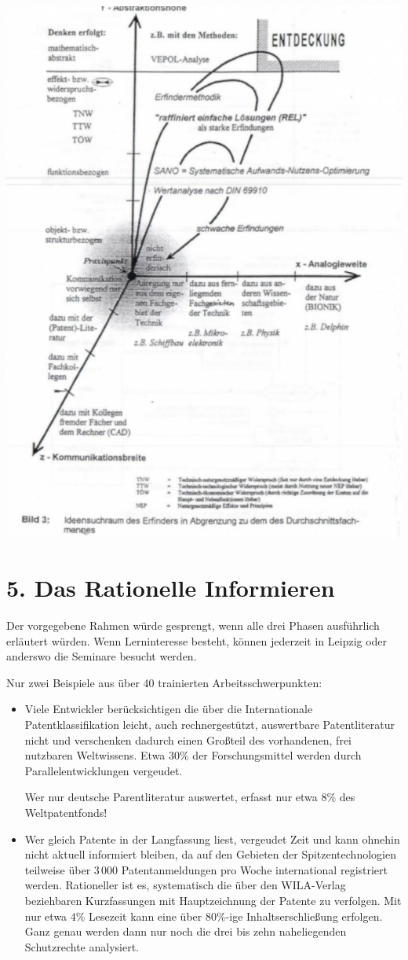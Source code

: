 \documentclass[11pt,a4paper]{article}
\begin{document}
\begin{center}
  \includegraphics[width=.9\textwidth]{HF-A.pdf}
\end{center}
\newpage

\section*{5. Das Rationelle Informieren}

Der vorgegebene Rahmen würde gesprengt, wenn alle drei Phasen ausführlich
erläutert wür\-den.  Wenn Lerninteresse besteht, können jederzeit in Leipzig
oder anderswo die Seminare besucht werden.

Nur zwei Beispiele aus über 40 trainierten Arbeitsschwerpunkten:
\begin{itemize}
\item Viele Entwickler berücksichtigen die über die Internationale
  Patentklassifikation leicht, auch rechnergestützt, auswertbare
  Patentliteratur nicht und verschenken dadurch einen Großteil des
  vorhandenen, frei nutzbaren Weltwissens. Etwa 30\% der Forschungsmittel
  werden durch Parallelentwicklungen vergeudet.

  Wer nur deutsche Parentliteratur auswertet, erfasst nur etwa 8\% des
  Weltpatentfonds!
\item Wer gleich Patente in der Langfassung liest, vergeudet Zeit und kann
  ohnehin nicht aktuell informiert bleiben, da auf den Gebieten der
  Spitzentechnologien teilweise über 3\,000 Patentanmeldungen pro Woche
  international registriert werden. Rationeller ist es, systematisch die über
  den WILA-Verlag beziehbaren Kurzfassungen mit Hauptzeichnung der Patente zu
  verfolgen. Mit nur etwa 4\% Lesezeit kann eine über 80\%-ige
  Inhaltserschließung erfolgen. Ganz genau werden dann nur noch die drei bis
  zehn naheliegenden Schutzrechte analysiert.
\end{itemize}
\end{document}
